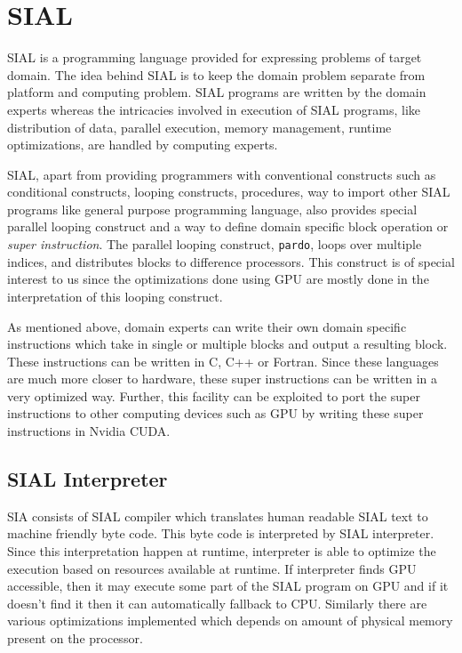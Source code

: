 \section{SIAL}
SIAL is a programming language provided for expressing problems of target
domain. The idea behind SIAL is to keep the domain problem separate from
platform and computing problem. SIAL programs are written by the domain experts
whereas the intricacies involved in execution of SIAL programs, like distribution of
data, parallel execution, memory management, runtime optimizations, are handled
by computing experts.

SIAL, apart from providing programmers with conventional constructs such as
conditional constructs, looping constructs, procedures, way to import other SIAL
programs like general purpose programming language, also provides special parallel looping construct and a way
to define domain specific block operation or \textit{super instruction}. The
parallel looping construct, \texttt{pardo}, loops over multiple indices, and
distributes blocks to difference processors. This construct is of special
interest to us since the optimizations done using GPU are mostly done in the
interpretation of this looping construct.

As mentioned above, domain experts can write their own domain specific
instructions which take in single or multiple blocks and output a resulting block. These
instructions can be written in C, C++ or Fortran. Since these languages are much
more closer to hardware, these super instructions can be written in a very
optimized way. Further, this facility can be exploited to port the super instructions to
other computing devices such as GPU by writing these super instructions in
Nvidia CUDA.

\subsection{SIAL Interpreter}
SIA consists of SIAL compiler which translates human readable SIAL text to
machine friendly byte code. This byte code is interpreted by SIAL interpreter.
Since this interpretation happen at runtime, interpreter is able to optimize the
execution based on resources available at runtime. If interpreter finds GPU
accessible, then it may execute some part of the SIAL program on GPU and if it
doesn't find it then it can automatically fallback to CPU. Similarly there are
various optimizations implemented which depends on amount of physical memory
present on the processor.

